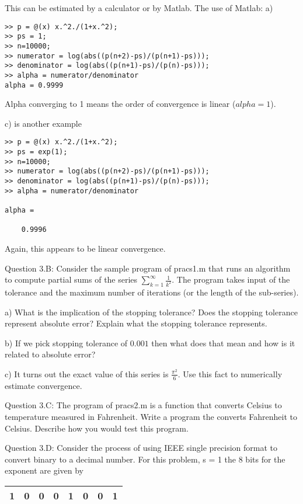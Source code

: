 \documentclass{article}
\def\ds{\displaystyle}
\begin{document}
{\color{teal} This can be estimated by a calculator or by Matlab. The use of Matlab:
a)
\begin{verbatim}
>> p = @(x) x.^2./(1+x.^2);
>> ps = 1;
>> n=10000;
>> numerator = log(abs((p(n+2)-ps)/(p(n+1)-ps)));
>> denominator = log(abs((p(n+1)-ps)/(p(n)-ps)));
>> alpha = numerator/denominator
alpha = 0.9999
\end{verbatim} 
Alpha converging to 1 means the order of convergence is linear ($\ds alpha =1$).

c) is another example
\begin{verbatim}
>> p = @(x) x.^2./(1+x.^2);
>> ps = exp(1);
>> n=10000;
>> numerator = log(abs((p(n+2)-ps)/(p(n+1)-ps)));
>> denominator = log(abs((p(n+1)-ps)/(p(n)-ps)));
>> alpha = numerator/denominator

alpha =

    0.9996
\end{verbatim}
Again, this appears to be linear convergence.}
%
\medskip \par \noindent
%
Question 3.B: Consider the sample program of pracs1.m that runs an algorithm to compute partial sums of the series $\ds \sum_{k=1}^{\infty} \frac 1{k^2}$. The program takes input of the tolerance and the maximum number of iterations (or the length of the sub-series). \par
a) What is the implication of the stopping tolerance? Does the stopping tolerance represent absolute error?  Explain what the stopping tolerance represents. \par
b) If we pick stopping tolerance of $\ds 0.001$ then what does that mean and how is it related to absolute error? \par
c) It turns out the exact value of this series is $\ds \frac {\pi ^2}6$. Use this fact to numerically estimate convergence. 
  \medskip \par \noindent
%
Question 3.C: The program of pracs2.m is a function that converts Celsius to temperature measured in Fahrenheit. Write a program the converts Fahrenheit to Celsius. Describe how you would test this program. 
\medskip \par \noindent
%
Question 3.D: Consider the process of using IEEE single precision format to convert binary to a decimal number. For this problem, s = 1 the 8 bits for the exponent are given by

\begin{tabular}{|c|c|c|c|c|c|c|c|}
\hline
1 & 0 & 0 & 0 & 1 & 0 & 0 & 1\\
\hline
\end{tabular}
\end{document}
